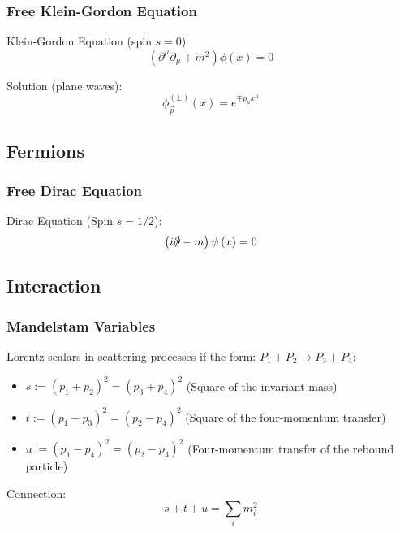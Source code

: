 		\subsubsection{Free Klein-Gordon Equation}
			\noindent
			Klein-Gordon Equation (spin $s=0$)
			\begin{equation}
				\left(\partial^\mu\partial_\mu+m^2\right) \phi(x) = 0
			\end{equation}

			\noindent
			Solution (plane waves):
			\begin{equation}
				{\phi}^{ ( \pm ) }_{\vec{p}} (x) = e^{\mp p_\mu x^\mu}
			\end{equation}

	\subsection{Fermions}
		\subsubsection{Free Dirac Equation}
			\noindent
			Dirac Equation (Spin $s=1/2$):
			\begin{equation}
				\left(  i\slashed{\partial} - m  \right) \psi\left( x \right) = 0
			\end{equation}

	\subsection{Interaction}
		\subsubsection{Mandelstam Variables}
			\noindent
			Lorentz scalars in scattering processes if the form: $P_1 + P_2 \rightarrow P_3 + P_4$:
			\begin{itemize}\itemsep -0pt	%
				\item $s:=(p_1+p_2)^2=(p_3+p_4)^2$ \hfill{(Square of the invariant mass)}
				\item $t:=(p_1-p_3)^2=(p_2-p_4)^2$ \hfill{(Square of the four-momentum transfer)}
				\item $u:=(p_1-p_4)^2=(p_2-p_3)^2$ \hfill{(Four-momentum transfer of the rebound particle)}
			\end{itemize}

			\noindent
			Connection:
			\begin{equation}
				s+t+u = \sum_i m_i^2
			\end{equation}
